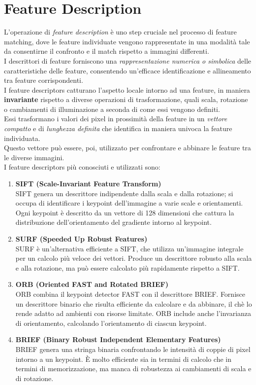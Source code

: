 \documentclass[12pt,a4paper,openright,twoside]{book}
\begin{document}
\section{Feature Description}
L'operazione di {\itshape feature description} è uno step cruciale nel processo di feature matching, dove le feature individuate vengono rappresentate in una modalità tale da consentirne il confronto e il match rispetto a immagini differenti.\\
I descrittori di feature forniscono una {\itshape rappresentazione numerica o simbolica} delle caratteristiche delle feature, consentendo un'efficace identificazione e allineamento tra feature corrispondenti.\\
I feature descriptors catturano l'aspetto locale intorno ad una feature, in maniera \textbf{invariante} rispetto a diverse operazioni di trasformazione, quali scala, rotazione o cambiamenti di illuminazione a seconda di come essi vengono definiti.\\
Essi trasformano i valori dei pixel in prossimità della feature in un {\itshape vettore compatto} e di {\itshape lunghezza definita} che identifica in maniera univoca la feature individuata.\\
Questo vettore può essere, poi, utilizzato per confrontare e abbinare le feature tra le diverse immagini.\\
I feature descriptors più conosciuti e utilizzati sono:
\begin{enumerate}

\item \textbf{SIFT (Scale-Invariant Feature Transform)}\\
SIFT genera un descrittore indipendente dalla scala e dalla rotazione; si occupa di identificare i keypoint dell'immagine a varie scale e orientamenti. Ogni keypoint è descritto da un vettore di 128 dimensioni che cattura la distribuzione dell'orientamento del gradiente intorno al keypoint.

\item \textbf{SURF (Speeded Up Robust Features)}\\
SURF è un'alternativa efficiente a SIFT, che utilizza un'immagine integrale per un calcolo più veloce dei vettori. Produce un descrittore robusto alla scala e alla rotazione, ma può essere calcolato più rapidamente rispetto a SIFT.

\item \textbf{ORB (Oriented FAST and Rotated BRIEF)}\\
ORB combina il keypoint detector FAST con il descrittore BRIEF. Fornisce un descrittore binario che risulta efficiente da calcolare e da abbinare, il chè lo rende adatto ad ambienti con risorse limitate. ORB include anche l'invarianza di orientamento, calcolando l'orientamento di ciascun keypoint.

\item \textbf{BRIEF (Binary Robust Independent Elementary Features)}\\
BRIEF genera una stringa binaria confrontando le intensità di coppie di pixel intorno a un keypoint. È molto efficiente sia in termini di calcolo che in termini di memorizzazione, ma manca di robustezza ai cambiamenti di scala e di rotazione.
\end{enumerate}
\end{document}
